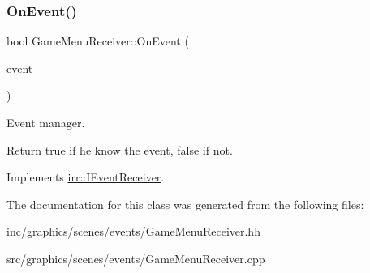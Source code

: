 \subsubsection{\texorpdfstring{On\+Event()}{OnEvent()}}
{\footnotesize\ttfamily bool Game\+Menu\+Receiver\+::\+On\+Event (\begin{DoxyParamCaption}\item[{const \hyperlink{structirr_1_1SEvent}{irr\+::\+S\+Event} \&}]{event }\end{DoxyParamCaption})\hspace{0.3cm}{\ttfamily [virtual]}}



Event manager. 

Return true if he know the event, false if not. 

Implements \hyperlink{classirr_1_1IEventReceiver_a571f744ceffc3b4fe8a81f529163eb97}{irr\+::\+I\+Event\+Receiver}.



The documentation for this class was generated from the following files\+:\begin{DoxyCompactItemize}
\item 
inc/graphics/scenes/events/\hyperlink{GameMenuReceiver_8hh}{Game\+Menu\+Receiver.\+hh}\item 
src/graphics/scenes/events/Game\+Menu\+Receiver.\+cpp\end{DoxyCompactItemize}
